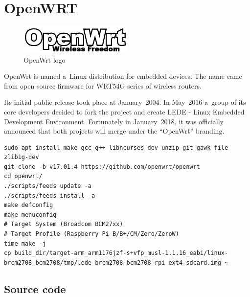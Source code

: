 \documentclass[printmode]{mgr}
\begin{document}
\section{OpenWRT}

\begin{figure}[htbp]
  \centering
    \includegraphics[width=0.5\textwidth]{openwrt-logo.png}
    \caption{OpenWrt logo}
  \label{fig:openwrt-logo}
\end{figure}

OpenWrt is named a~Linux distribution for embedded devices. The name came from open source firmware for WRT54G series of wireless routers.

Its initial public release took place at January~2004. In May~2016 a~group of its core developers decided to fork the project and create LEDE - Linux Embedded Development Environment. Fortunately in January~2018, it was officially announced that both projects will merge under the ``OpenWrt'' branding.





\begin{lstlisting}
sudo apt install make gcc g++ libncurses-dev unzip git gawk file zlib1g-dev
git clone -b v17.01.4 https://github.com/openwrt/openwrt
cd openwrt/
./scripts/feeds update -a
./scripts/feeds install -a
make defconfig
make menuconfig
# Target System (Broadcom BCM27xx)
# Target Profile (Raspberry Pi B/B+/CM/Zero/ZeroW)
time make -j
cp build_dir/target-arm_arm1176jzf-s+vfp_musl-1.1.16_eabi/linux-brcm2708_bcm2708/tmp/lede-brcm2708-bcm2708-rpi-ext4-sdcard.img ~
\end{lstlisting}



\subsection*{Source code}
\end{document}
